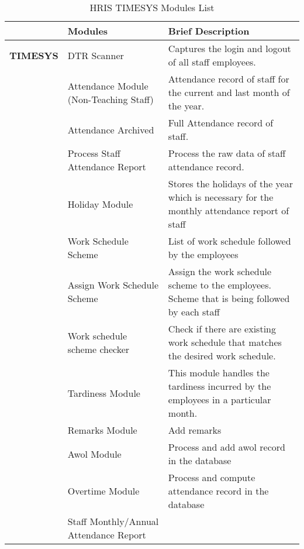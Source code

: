 \begin{table}[H]
\begin{tabular}{@{}p{2cm}p{3.5cm}p{9cm}@{}}
\toprule
\multicolumn{1}{l}{} & \textbf{Modules}                       & \textbf{Brief Description}                                                                    \\ \midrule
\textbf{TIMESYS}     & DTR Scanner                            & Captures the login and logout of all staff employees.                                         \\
                        & Attendance Module (Non-Teaching Staff) & Attendance record of staff for the current and last month of the year.                        \\
                        & Attendance Archived                    & Full Attendance record of staff.                                                              \\
                        & Process Staff Attendance Report        & Process the raw data of staff attendance record.                                              \\
                        & Holiday Module                         & Stores the holidays of the year which is necessary for the monthly attendance report of staff \\
                        & Work Schedule Scheme                   & List of work schedule followed by the employees                                               \\
                        & Assign Work Schedule Scheme            & Assign the work schedule scheme to the employees. Scheme that is being followed by each staff \\
                        & Work schedule scheme checker           & Check if there are existing work schedule that matches the desired work schedule.             \\
                        & Tardiness Module                       & This module handles the tardiness incurred by the employees in a particular month.            \\
                        & Remarks Module                         & Add remarks                                                                                   \\
                        & Awol Module                            & Process and add awol record in the database                                                   \\
                        & Overtime Module                        & Process and compute attendance record in the database                                         \\
                        & Staff Monthly/Annual Attendance Report &                                                                                               \\ \bottomrule
\end{tabular}
\caption{HRIS TIMESYS Modules List}
\label{tab:my_label}
\end{table}

